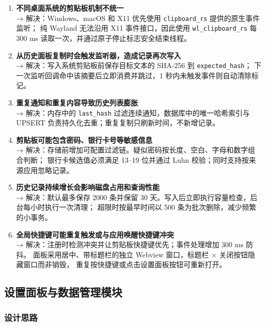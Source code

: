 \documentclass[12pt,a4paper]{ctexart}
\begin{document}
\begin{enumerate}[label=(\arabic*)]
  \item \textbf{不同桌面系统的剪贴板机制不统一}
    \\→ 解决：Windows、macOS 和 X11 优先使用 \texttt{clipboard\_rs} 提供的原生事件监听；
    纯 Wayland 无法沿用 X11 事件接口，因此使用 \texttt{wl\_clipboard\_rs} 每 300 ms 读取一次，并通过原子停止标志安全结束线程。

  \item \textbf{从历史面板复制时会触发监听器，造成记录再次写入}
    \\→ 解决：写入系统剪贴板前保存目标文本的 SHA-256 到 \texttt{expected\_hash}；
    下一次监听回调命中该摘要后立即消费并跳过，1 秒内未触发事件则自动清除标记。

  \item \textbf{重复通知和重复内容导致历史列表膨胀}
    \\→ 解决：内存中的 \texttt{last\_hash} 过滤连续通知，数据库中的唯一哈希索引与 UPSERT
    负责持久化去重；重复复制只刷新时间，不新增记录。

  \item \textbf{剪贴板可能包含密码、银行卡号等敏感信息}
    \\→ 解决：存储前增加可配置过滤链。疑似密码按长度、空白、字母和数字组合判断；
    银行卡候选值必须满足 13--19 位并通过 Luhn 校验；同时支持按来源应用忽略记录。

  \item \textbf{历史记录持续增长会影响磁盘占用和查询性能}
    \\→ 解决：默认最多保存 2000 条并保留 30 天。写入后立即执行容量检查，后台每小时执行一次清理；
    超限时按最早时间以 500 条为批次删除，减少频繁的小事务。

  \item \textbf{全局快捷键可能重复触发或与应用唤醒快捷键冲突}
    \\→ 解决：注册时检测冲突并让剪贴板快捷键优先；事件处理增加 300 ms 防抖。
    面板采用居中、带标题栏的独立 Webview 窗口，标题栏 × 关闭按钮隐藏窗口而非销毁，
    重复按快捷键或点击设置面板按钮可重新打开。
\end{enumerate}


\subsection{设置面板与数据管理模块}

\subsubsection{设计思路}
\end{document}
